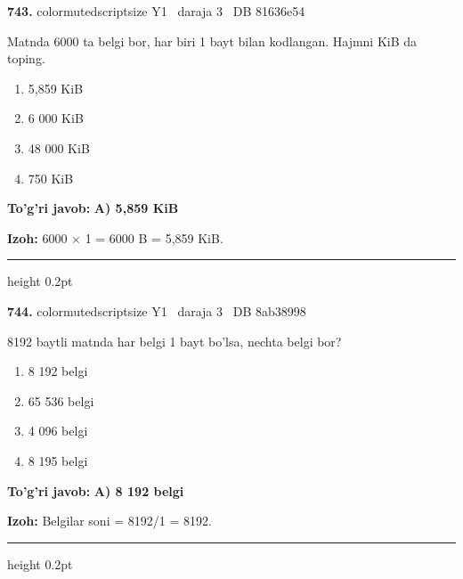 \documentclass[10pt,a4paper,oneside]{article}
\begin{document}
\noindent\textbf{\color{ink}743.}  {color{muted}scriptsize Y1 \textbullet\ daraja 3 \textbullet\ DB 81636e54}
\par
Matnda 6000 ta belgi bor, har biri 1 bayt bilan kodlangan. Hajmni KiB da toping.
\begin{enumerate}[label=\Alph*),leftmargin=9mm]
\item 5,859 KiB
\item 6 000 KiB
\item 48 000 KiB
\item 750 KiB
\end{enumerate}
\begin{tcolorbox}[enhanced,breakable,colback=teal!4,colframe=teal!50!black,boxrule=0.5pt,arc=1.1mm,left=3mm,right=3mm,top=1.7mm,bottom=1.7mm,before skip=2mm,after skip=2mm]
\textbf{\color{teal}To'g'ri javob:} \textbf{A) 5,859 KiB}
\par\smallskip
\textbf{Izoh:} 6000 \ensuremath{\times} 1 = 6000 B = 5,859 KiB.
\end{tcolorbox}
\vspace{2mm}\hrule height 0.2pt \vspace{3mm}

\noindent\textbf{\color{ink}744.}  {color{muted}scriptsize Y1 \textbullet\ daraja 3 \textbullet\ DB 8ab38998}
\par
8192 baytli matnda har belgi 1 bayt bo'lsa, nechta belgi bor?
\begin{enumerate}[label=\Alph*),leftmargin=9mm]
\item 8 192 belgi
\item 65 536 belgi
\item 4 096 belgi
\item 8 195 belgi
\end{enumerate}
\begin{tcolorbox}[enhanced,breakable,colback=teal!4,colframe=teal!50!black,boxrule=0.5pt,arc=1.1mm,left=3mm,right=3mm,top=1.7mm,bottom=1.7mm,before skip=2mm,after skip=2mm]
\textbf{\color{teal}To'g'ri javob:} \textbf{A) 8 192 belgi}
\par\smallskip
\textbf{Izoh:} Belgilar soni = 8192/1 = 8192.
\end{tcolorbox}
\vspace{2mm}\hrule height 0.2pt \vspace{3mm}
\end{document}
